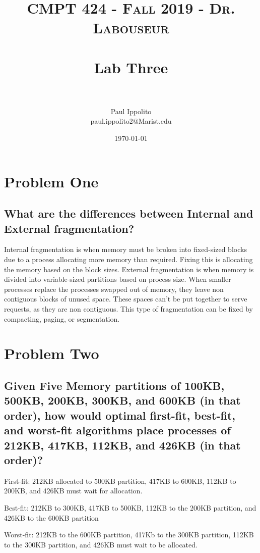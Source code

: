 \documentclass[letterpaper, 10pt,DIV=13]{scrartcl}
\title{	
   \normalfont \normalsize 
   \textsc{CMPT 424 - Fall 2019 - Dr. Labouseur} \\[10pt] %
   \horrule{0.5pt} \\[0.25cm] 	%
   \huge Lab Three  \\     	    %
   \horrule{0.5pt} \\[0.25cm] 	%
}
\author{Paul Ippolito \\ \normalsize paul.ippolito2@Marist.edu}
\date{\normalsize\today} 	%
\numberwithin{equation}{section} %
\numberwithin{figure}{section} %
\numberwithin{table}{section} %
\begin{document}
\maketitle %

\section{Problem One}
\subsection{What are the differences between Internal and External fragmentation?}

Internal fragmentation is when memory must be broken into fixed-sized blocks due to a process allocating more memory than required. Fixing this is allocating the memory based on the block sizes. External fragmentation is when memory is divided into variable-sized partitions based on process size. When smaller processes replace the processes swapped out of memory, they leave non contiguous blocks of unused space. These spaces can't be put together to serve requests, as they are non contiguous. This type of fragmentation can be fixed by compacting, paging, or segmentation.

\section{Problem Two}
\subsection{Given Five Memory partitions of 100KB, 500KB, 200KB, 300KB, and 600KB (in that order), how would optimal first-fit, best-fit, and worst-fit algorithms place processes of 212KB, 417KB, 112KB, and 426KB (in that order)?}

First-fit: 212KB allocated to 500KB partition, 417KB to 600KB, 112KB to 200KB, and 426KB must wait for allocation.

Best-fit: 212KB to 300KB, 417KB to 500KB, 112KB to the 200KB partition, and 426KB to the 600KB partition

Worst-fit: 212KB to the 600KB partition, 417Kb to the 300KB partition, 112KB to the 300KB partition, and 426KB must wait to be allocated.
\end{document}
